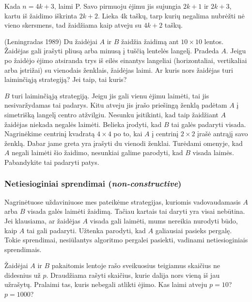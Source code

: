 Kada $n=4k+3$, laimi P. Savo pirmuoju ėjimu jis sujungia $2k+1$ ir $2k+3$,
kartu iš žaidimo iškrinta $2k+2$. Lieka 4k taškų, tarp kurių negalima
nubrėžti nė vieno skersmens, tad žaidžiama kaip atveju su $4k+2$ taškų. 

\begin{pavnr}{(Leningradas 1989)}
  Du žaidėjai $A$ ir $B$ žaidžia žaidimą ant $10\times 10$ lentos. Žaidėjas
  gali įrašyti pliusą arba minusą į tuščią lentelės langelį. Pradeda $A$.
  Jeigu po žaidėjo ėjimo atsiranda trys iš eilės einantys langeliai
  (horizontaliai, vertikaliai arba įstrižai) su vienodais ženklais,
  žaidėjas laimi. Ar kuris nors žaidėjas turi laiminčiąją strategiją? Jei
  taip, tai kuris?
\end{pavnr}

$B$ turi laiminčiąją strategiją. Jeigu jis gali vienu ėjimu laimėti, tai jis
nesivaržydamas  tai padarys. Kitu atveju jis įrašo priešingą ženklą padėtam
$A$ į simetrišką langelį centro atžvilgiu. Nesunku įsitikinti, kad taip
žaidžiant $A$ žaidėjas niekada negalės laimėti. Belieka
įrodyti, kad $B$ tai galės padaryti visada. Nagrinėkime centrinį kvadratą
$4\times 4$ po to, kai $A$ į centrinį $2\times 2$ įrašė antrąjį savo
ženklą. Dabar jame greta yra įrašyti du vienodi ženklai. Turėdami omenyje,
kad $A$ negali laimėti šio žaidimo, nesunkiai galime parodyti, kad $B$ visada
laimės. Pabandykite tai padaryti patys.  

\subsubsection{Netiesioginiai sprendimai (\emph{non-constructive})}

Nagrinėtuose uždaviniuose mes pateikėme strategijas, kuriomis
vadovaudamasis $A$ arba $B$ visada galės laimėti žaidimą. Tačiau kartais tai
daryti yra visai nebūtina. Jei klausiama, ar žaidėjas $A$ visada gali
laimėti, mums nereikia nurodyti būdo, kaip $A$ tai gali padaryti. Užtenka
parodyti, kad $A$ galiausiai pasieks pergalę. Tokie sprendimai, nesiūlantys
algoritmo pergalei pasiekti, vadinami netiesioginiais sprendimais. 

\begin{pavnr}
  Žaidėjai $A$ ir $B$ pakaitomis lentoje rašo sveikuosius teigiamus skaičius
  ne didesnius už $p$. Draudžiama rašyti skaičius, kurie dalija nors vieną iš
  jau užrašytų. Pralaimi tas, kuris nebegali atlikti ėjimo. Kas laimi atveju
  $p=10$? $p=1000$?
\end{pavnr}

